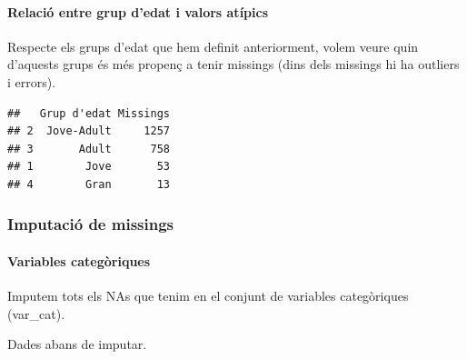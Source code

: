 \documentclass[
]{article}
\newenvironment{Shaded}{\begin{snugshade}}{\end{snugshade}}
\newcommand{\AttributeTok}[1]{\textcolor[rgb]{0.77,0.63,0.00}{#1}}
\newcommand{\ConstantTok}[1]{\textcolor[rgb]{0.00,0.00,0.00}{#1}}
\newcommand{\FunctionTok}[1]{\textcolor[rgb]{0.00,0.00,0.00}{#1}}
\newcommand{\NormalTok}[1]{#1}
\newcommand{\OtherTok}[1]{\textcolor[rgb]{0.56,0.35,0.01}{#1}}
\newcommand{\SpecialCharTok}[1]{\textcolor[rgb]{0.00,0.00,0.00}{#1}}
\newcommand{\StringTok}[1]{\textcolor[rgb]{0.31,0.60,0.02}{#1}}
\begin{document}
\hypertarget{relaciuxf3-entre-grup-dedat-i-valors-atuxedpics}{%
\paragraph{Relació entre grup d'edat i valors
atípics}\label{relaciuxf3-entre-grup-dedat-i-valors-atuxedpics}}

Respecte els grups d'edat que hem definit anteriorment, volem veure quin
d'aquests grups és més propenç a tenir missings (dins dels missings hi
ha outliers i errors).

\begin{Shaded}
\end{Shaded}

\begin{verbatim}
##   Grup d'edat Missings
## 2  Jove-Adult     1257
## 3       Adult      758
## 1        Jove       53
## 4        Gran       13
\end{verbatim}

\hypertarget{imputaciuxf3-de-missings}{%
\subsubsection{Imputació de missings}\label{imputaciuxf3-de-missings}}

\hypertarget{variables-categuxf2riques}{%
\paragraph{Variables categòriques}\label{variables-categuxf2riques}}

Imputem tots els NAs que tenim en el conjunt de variables categòriques
(var\_cat).

Dades abans de imputar.
\end{document}
